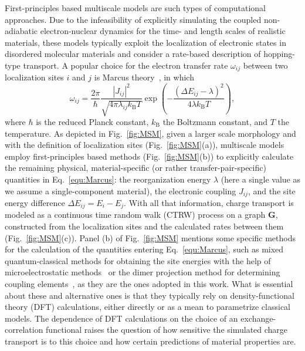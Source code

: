 \documentclass[%
 reprint,
superscriptaddress,
 amsmath,amssymb,
 aps,
prb,
floatfix
]{revtex4-2}
\begin{document}
First-principles based multiscale models are such types of computational approaches. Due to the infeasibility of explicitly simulating the coupled non-adiabatic electron-nuclear dynamics for the time- and length scales of realistic materials, these models typically exploit the localization of electronic states in disordered molecular materials and consider a rate-based description of hopping-type transport. A popular choice for the electron transfer rate $\omega_{ij}$ between two localization sites $i$ and $j$ is Marcus theory~\cite{marcus_theory_1956, marcus_electron_1993}, in which
%
\begin{equation}
    \omega_{ij} = \frac{2\pi}{\hbar} \frac{|J_{ij}|^2}{\sqrt{4\pi \lambda_{ij} k_\text{B}T}} \exp\left(-\frac{(\Delta E_{ij} - \lambda)^2}{4\lambda k_\text{B}T}\right) ,
    \label{equ:Marcus}
\end{equation}
%
where $\hbar$ is the reduced Planck constant,  $k_\text{B}$ the Boltzmann constant, and $T$ the temperature. As depicted in Fig.~\ref{fig:MSM}, given a larger scale morphology and with the definition of localization sites (Fig.~\ref{fig:MSM}(a)), multiscale models employ first-principles based methods (Fig.~\ref{fig:MSM}(b)) to explicitly calculate the remaining physical, material-specific (or rather transfer-pair-specific) quantities in Eq.~\ref{equ:Marcus}: the reorganization energy $\lambda$ (here a single value as we assume a single-component material), the electronic coupling $J_{ij}$, and the site energy difference $\Delta E_{ij} = E_i - E_j$. With all that information, charge transport is modeled as a continuous time random walk (CTRW) process on a graph $\mathbf{G}$, constructed from the localization sites and the calculated rates between them (Fig.~\ref{fig:MSM}(c)). Panel (b) of Fig.~\ref{fig:MSM} mentions some specific methods for the calculation of the quantities entering Eq.~\ref{equ:Marcus}, such as mixed quantum-classical methods for obtaining the site energies with the help of microelectrostatic methods~\cite{poelking_impact_2015, poelking_long-range_2016} or the dimer projection method for determining coupling elements~\cite{baumeier_density_2010}, as they are the ones adopted in this work. What is essential about these and alternative ones is that they typically rely on density-functional theory (DFT) calculations, either directly or as a mean to parametrize classical models. The dependence of DFT calculations on the choice of an exchange-correlation functional raises the question of how sensitive the simulated charge transport is to this choice and how certain predictions of material properties are. 
\end{document}
